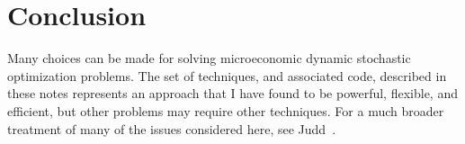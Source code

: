 \documentclass[\econtexRoot/SolvingMicroDSOPs]{subfiles}
\begin{document}
\hypertarget{conclusion}{}
\section{Conclusion}

Many choices can be made for solving microeconomic dynamic stochastic optimization problems.  The set of techniques, and associated code, described in these notes represents an approach that I have found to be powerful, flexible, and efficient, but other problems may require other techniques.  For a much broader treatment of many of the issues considered here, see Judd~\citeyearpar{judd:book}.
\end{document}
